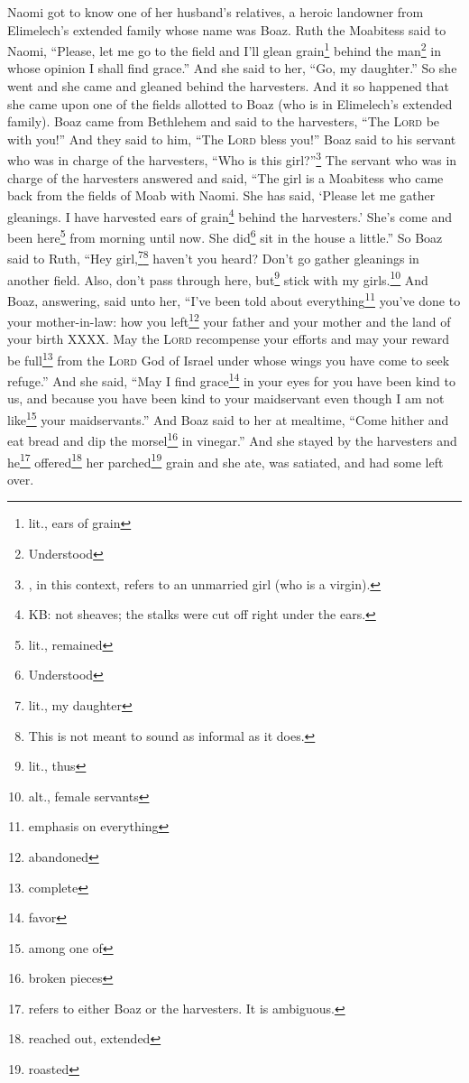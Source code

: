 
\begin{inparaenum}
     Naomi got to know one of her husband's relatives, a heroic landowner from Elimelech's extended family whose name was Boaz.%
     Ruth the Moabitess said to Naomi, ``Please, let me go to the field and I'll glean grain\footnote{lit., ears of grain} behind the man\footnote{Understood} in whose opinion I shall find grace.'' And she said to her, ``Go, my daughter.''%
     So she went and she came and gleaned behind the harvesters. And it so happened that she came upon one of the fields allotted to Boaz (who is in Elimelech's extended family).%
     Boaz came from Bethlehem and said to the harvesters, ``The \textsc{Lord} be with you!'' And they said to him, ``The \textsc{Lord} bless you!''%
     Boaz said to his servant who was in charge of the harvesters, ``Who is this girl?''\footnote{, in this context, refers to an unmarried girl (who is a virgin).}%
     The servant who was in charge of the harvesters answered and said, ``The girl is a Moabitess who came back from the fields of Moab with Naomi.%
     She has said, `Please let me gather gleanings. I have harvested ears of grain\footnote{KB: not sheaves; the stalks were cut off right under the ears.} behind the harvesters.' She's come and been here\footnote{lit., remained} from morning until now. She did\footnote{Understood} sit in the house a little.''%
     So Boaz said to Ruth, ``Hey girl,\footnote{lit., my daughter}\footnote{This is not meant to sound as informal as it does.} haven't you heard? Don't go gather gleanings in another field. Also, don't pass through here, but\footnote{lit., thus} stick with my girls.\footnote{alt., female servants}%
     And Boaz, answering, said unto her, ``I've been told about everything\footnote{emphasis on everything} you've done to your mother-in-law: how you left\footnote{abandoned} your father and your mother and the land of your birth XXXX.%
     May the \textsc{Lord} recompense your efforts and may your reward be full\footnote{complete} from the \textsc{Lord} God of Israel under whose wings you have come to seek refuge.''%
     And she said, ``May I find grace\footnote{favor} in your eyes for you have been kind to us, and because you have been kind to your maidservant even though I am not like\footnote{among one of} your maidservants.''%
     And Boaz said to her at mealtime, ``Come hither and eat bread and dip the morsel\footnote{broken pieces} in vinegar.'' And she stayed by the harvesters and he\footnote{refers to either Boaz or the harvesters. It is ambiguous.} offered\footnote{reached out, extended} her parched\footnote{roasted} grain and she ate, was satiated, and had some left over.%

\end{inparaenum}
